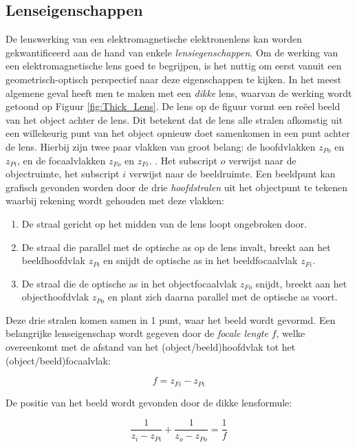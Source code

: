 \documentclass[we,twoside,openright,a4paper,11pt]{uantwerpenbamathesis}
\begin{document}
\subsection{Lenseigenschappen}
De lenswerking van een elektromagnetische elektronenlens kan worden gekwantificeerd aan de hand van enkele \textit{lensiegenschappen}. Om de werking van een elektromagnetische lens goed te begrijpen, is het nuttig om eerst vanuit een geometrisch-optisch perspectief naar deze eigenschappen te kijken. In het meest algemene geval heeft men te maken met een \textit{dikke} lens, waarvan de werking wordt getoond op Figuur \ref{fig:Thick_Lens}. De lens op de figuur vormt een reëel beeld van het object achter de lens. Dit betekent dat de lens alle stralen afkomstig uit een willekeurig punt van het object opnieuw doet samenkomen in een punt achter de lens. Hierbij zijn twee paar vlakken van groot belang: de hoofdvlakken $z_{Po}$ en $z_{Pi}$, en de focaalvlakken $z_{Fo}$ en $z_{Fi}$. \cite{PWHawkes}. Het subscript $o$ verwijst naar de objectruimte, het subscript $i$ verwijst naar de beeldruimte. Een beeldpunt kan grafisch gevonden worden door de drie \textit{hoofdstralen} uit het objectpunt te tekenen waarbij rekening wordt gehouden met deze vlakken:
\begin{enumerate}
    \item De straal gericht op het midden van de lens loopt ongebroken door.
    \item De straal die parallel met de optische as op de lens invalt, breekt aan het beeldhoofdvlak $z_{Pi}$ en snijdt de optische as in het beeldfocaalvlak $z_{Fi}$.
    \item De straal die de optische as in het objectfocaalvlak $z_{Fo}$ snijdt, breekt aan het objecthoofdvlak $z_{Po}$ en plant zich daarna parallel met de optische as voort.
\end{enumerate}
Deze drie stralen komen samen in 1 punt, waar het beeld wordt gevormd. Een belangrijke lenseigenschap wordt gegeven door de \textit{focale lengte} $f$, welke overeenkomt met de afstand van het (object/beeld)hoofdvlak tot het (object/beeld)focaalvlak:

\begin{equation}\label{eq:focal_length}
    f=z_{Fi}-z_{Pi}
\end{equation}

De positie van het beeld wordt gevonden door de dikke lensformule:

\begin{equation}\label{eq:thick_lens}
    \frac{1}{z_i-z_{Pi}}+\frac{1}{z_o-z_{Po}}=\frac{1}{f}
\end{equation}
\end{document}
